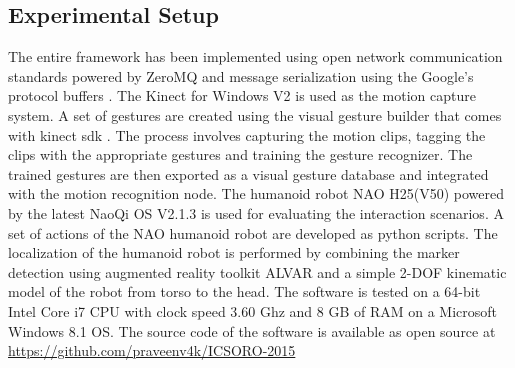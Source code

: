 \documentclass{llncs}
\begin{document}
\subsection{Experimental Setup}
\quad The entire framework has been implemented using open network communication standards powered by ZeroMQ \cite{ZeroMQ} and message serialization using the Google's protocol buffers \cite{ProtocolBuffers}. The Kinect for Windows V2 is used as the motion capture system. A set of gestures are created using the visual gesture builder that comes with kinect sdk \cite{Kinect2014}. The process involves capturing the motion clips, tagging the clips with the appropriate gestures and training the gesture recognizer. The trained gestures are then exported as a visual gesture database and integrated with the motion recognition node. The humanoid robot NAO H25(V50) powered by the latest NaoQi OS V2.1.3 is used for evaluating the interaction scenarios.  A set of actions of the NAO humanoid robot are developed as python scripts. The localization of the humanoid robot is performed by combining the marker detection using augmented reality toolkit ALVAR \cite{ALVAR} and a simple 2-DOF kinematic model of the robot from torso to the head. The software is tested on a 64-bit Intel Core i7 CPU with clock speed 3.60 Ghz and 8 GB of RAM on a Microsoft Windows 8.1 OS. The source code of the software is available as open source at \url{https://github.com/praveenv4k/ICSORO-2015}
\end{document}
